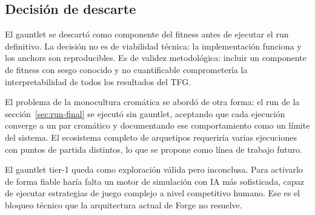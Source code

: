 \subsection{Decisión de descarte}

El gauntlet se descartó como componente del fitness antes de ejecutar el run definitivo. La decisión no es de viabilidad técnica: la implementación funciona y los anchors son reproducibles. Es de validez metodológica: incluir un componente de fitness con sesgo conocido y no cuantificable comprometería la interpretabilidad de todos los resultados del TFG.

El problema de la monocultura cromática se abordó de otra forma: el run de la sección~\ref{sec:run-final} se ejecutó sin gauntlet, aceptando que cada ejecución converge a un par cromático y documentando ese comportamiento como un límite del sistema. El ecosistema completo de arquetipos requeriría varias ejecuciones con puntos de partida distintos, lo que se propone como línea de trabajo futuro.

El gauntlet tier-1 queda como exploración válida pero inconclusa. Para activarlo de forma fiable haría falta un motor de simulación con IA más sofisticada, capaz de ejecutar estrategias de juego complejo a nivel competitivo humano. Ese es el bloqueo técnico que la arquitectura actual de Forge no resuelve.
